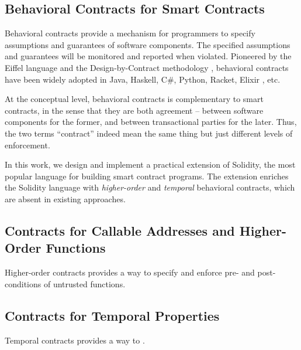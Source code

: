 \subsection*{\textbf{Behavioral Contracts for Smart Contracts}}

Behavioral contracts provide a mechanism for programmers to specify assumptions
and guarantees of software components. The specified assumptions and guarantees
will be monitored and reported when violated.
Pioneered by the Eiffel language \cite{DBLP:books/ph/Meyer91} and the
Design-by-Contract methodology \cite{DBLP:conf/tools/Meyer98a}, behavioral
contracts have been widely adopted in Java, Haskell, C\#, Python, Racket,
Elixir \cite{DBLP:conf/erlang/0001BBHMEF22}, etc. 


At the conceptual level, behavioral contracts is complementary to smart
contracts, in the sense that they are both agreement -- between software
components for the former, and between transactional parties for the later.
Thus, the two terms ``contract'' indeed mean the same thing but just different
levels of enforcement.

In this work, we design and implement a practical extension of Solidity, the
most popular language for building smart contract programs. The extension
enriches the Solidity language with \emph{higher-order} and \emph{temporal}
behavioral contracts, which are absent in existing approaches.

\subsection*{\textbf{Contracts for Callable Addresses and Higher-Order Functions}}

Higher-order contracts provides a way to specify and enforce pre- and
post-conditions of untrusted functions. 


\subsection*{\textbf{Contracts for Temporal Properties}}

Temporal contracts provides a way to .

